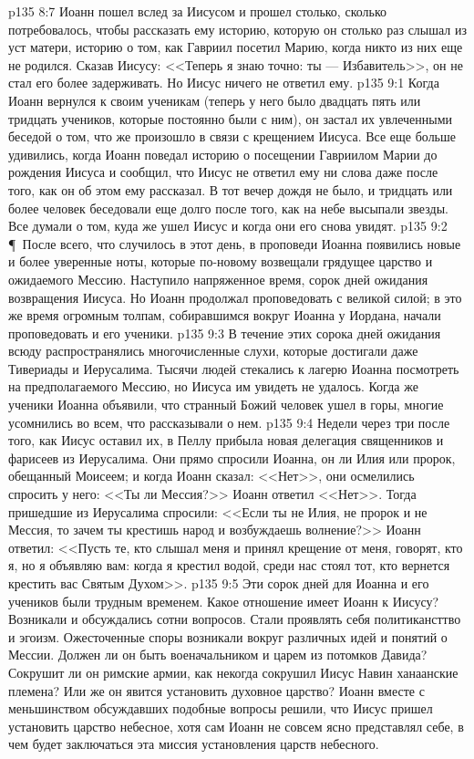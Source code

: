 \vs p135 8:7 Иоанн пошел вслед за Иисусом и прошел столько, сколько потребовалось, чтобы рассказать ему историю, которую он столько раз слышал из уст матери, историю о том, как Гавриил посетил Марию, когда никто из них еще не родился. Сказав Иисусу: <<Теперь я знаю точно: ты --- Избавитель>>, он не стал его более задерживать. Но Иисус ничего не ответил ему.
\vs p135 9:1 Когда Иоанн вернулся к своим ученикам (теперь у него было двадцать пять или тридцать учеников, которые постоянно были с ним), он застал их увлеченными беседой о том, что же произошло в связи с крещением Иисуса. Все еще больше удивились, когда Иоанн поведал историю о посещении Гавриилом Марии до рождения Иисуса и сообщил, что Иисус не ответил ему ни слова даже после того, как он об этом ему рассказал. В тот вечер дождя не было, и тридцать или более человек беседовали еще долго после того, как на небе высыпали звезды. Все думали о том, куда же ушел Иисус и когда они его снова увидят.
\vs p135 9:2 \P\ После всего, что случилось в этот день, в проповеди Иоанна появились новые и более уверенные ноты, которые по\hyp{}новому возвещали грядущее царство и ожидаемого Мессию. Наступило напряженное время, сорок дней ожидания возвращения Иисуса. Но Иоанн продолжал проповедовать с великой силой; в это же время огромным толпам, собиравшимся вокруг Иоанна у Иордана, начали проповедовать и его ученики.
\vs p135 9:3 В течение этих сорока дней ожидания всюду распространялись многочисленные слухи, которые достигали даже Тивериады и Иерусалима. Тысячи людей стекались к лагерю Иоанна посмотреть на предполагаемого Мессию, но Иисуса им увидеть не удалось. Когда же ученики Иоанна объявили, что странный Божий человек ушел в горы, многие усомнились во всем, что рассказывали о нем.
\vs p135 9:4 Недели через три после того, как Иисус оставил их, в Пеллу прибыла новая делегация священников и фарисеев из Иерусалима. Они прямо спросили Иоанна, он ли Илия или пророк, обещанный Моисеем; и когда Иоанн сказал: <<Нет>>, они осмелились спросить у него: <<Ты ли Мессия?>> Иоанн ответил <<Нет>>. Тогда пришедшие из Иерусалима спросили: <<Если ты не Илия, не пророк и не Мессия, то зачем ты крестишь народ и возбуждаешь волнение?>> Иоанн ответил: <<Пусть те, кто слышал меня и принял крещение от меня, говорят, кто я, но я объявляю вам: когда я крестил водой, среди нас стоял тот, кто вернется крестить вас Святым Духом>>.
\vs p135 9:5 Эти сорок дней для Иоанна и его учеников были трудным временем. Какое отношение имеет Иоанн к Иисусу? Возникали и обсуждались сотни вопросов. Стали проявлять себя политикансттво и эгоизм. Ожесточенные споры возникали вокруг различных идей и понятий о Мессии. Должен ли он быть военачальником и царем из потомков Давида? Сокрушит ли он римские армии, как некогда сокрушил Иисус Навин ханаанские племена? Или же он явится установить духовное царство? Иоанн вместе с меньшинством обсуждавших подобные вопросы решили, что Иисус пришел установить царство небесное, хотя сам Иоанн не совсем ясно представлял себе, в чем будет заключаться эта миссия установления царств небесного.

